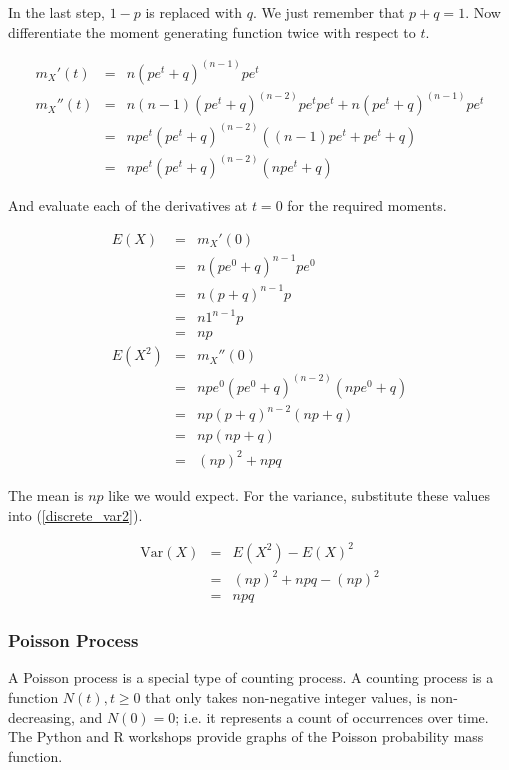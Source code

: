 \documentclass[]{article}
\begin{document}
In the last step, $1-p$ is replaced with $q$.  We just
remember that $p + q = 1$.  Now
differentiate the moment generating function twice with
respect to $t$.

\begin{eqnarray*}
m_X'(t) & = & n(pe^t + q)^{(n-1)} pe^t \\
m_X''(t) & = & n(n-1)(pe^t + q)^{(n-2)} pe^t pe^t +
          n(pe^t + q)^{(n-1)} pe^t \\
   & = & npe^t(pe^t + q)^{(n-2)}((n-1)pe^t + pe^t + q) \\
   & = & npe^t(pe^t + q)^{(n-2)}(npe^t + q)
\end{eqnarray*}

And evaluate each of the derivatives at $t=0$ for the
required moments.

\begin{eqnarray*}
E(X) & = & m_X'(0) \\
   & = & n(pe^0 + q)^{n-1} pe^0 \\
   & = & n(p+q)^{n-1}p \\
   & = & n1^{n-1}p \\
   & = & np  \\
E(X^2) & = & m_X''(0) \\
   & = & npe^0(pe^0 + q)^{(n-2)}(npe^0 + q) \\
   & = & np(p+q)^{n-2} (np + q) \\
   & = & np (np+q) \\
   & = & (np)^2 + npq
\end{eqnarray*}

The mean is $np$ like we would expect.  For the variance,
substitute these values into (\ref{discrete_var2}).

\begin{eqnarray}
\mbox{Var}(X) & = & E(X^2) - E(X)^2 \nonumber \\
   & = & (np)^2 + npq - (np)^2 \nonumber \\
   & = & npq \label{binomial_var}
\end{eqnarray}

\subsubsection{Poisson Process}

A Poisson process is a special type of counting process.
A counting process is a function $N(t), t \ge 0$ that
only takes non-negative integer values, is non-decreasing,
and $N(0)=0$;
i.e. it represents a count of occurrences over time.  The
Python and R workshops provide graphs of the Poisson
probability mass function.
\end{document}
